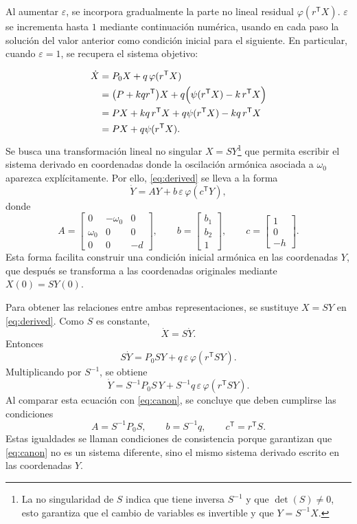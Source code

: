 \documentclass[journal]{IEEEtran}
\begin{document}
Al aumentar \(\varepsilon\), se incorpora gradualmente la
parte no lineal residual \(\varphi(r^\mathsf{T}X)\). \(\varepsilon\) se incrementa
hasta \(1\) mediante continuación numérica, usando en cada paso la solución
del valor anterior como condición inicial para el siguiente. En particular, cuando
\(\varepsilon=1\), se recupera el sistema objetivo\cite{GuanXie2025,KuznetsovEtAl2017}:

\begin{equation}
\begin{aligned}
\dot X
&=P_0X+q\,\varphi(r^\mathsf{T}X)\\
&=\bigl(P+kqr^\mathsf{T}\bigr)X
  +q\Bigl(\psi(r^\mathsf{T}X)-k\,r^\mathsf{T}X\Bigr)\\
&=PX+kq\,r^\mathsf{T}X
  +q\psi(r^\mathsf{T}X)-kq\,r^\mathsf{T}X\\
&=PX+q\psi(r^\mathsf{T}X).
\end{aligned}
\end{equation}
\noindent Se busca una transformación lineal no singular \(X=SY\)\footnote{La no singularidad de \(S\) indica que tiene inversa \(S^{-1}\) y que \(\det(S)\neq 0\), esto garantiza que el cambio de variables es invertible y que \(Y=S^{-1}X\).} que permita escribir el sistema derivado en coordenadas donde la oscilación armónica asociada a \(\omega_0\) aparezca explícitamente. Por ello, \eqref{eq:derived} se lleva a la forma
\begin{equation}\label{eq:canon}
\dot Y = AY + b\,\varepsilon\,\varphi(c^\mathsf{T}Y),
\end{equation}
donde
\[
A=
\begin{bmatrix}
0 & -\omega_0 & 0\\
\omega_0 & 0 & 0\\
0 & 0 & -d
\end{bmatrix},
\qquad
b=\begin{bmatrix}b_1\\ b_2\\ 1\end{bmatrix},
\qquad
c=\begin{bmatrix}1\\0\\-h\end{bmatrix}.
\]
Esta forma facilita construir una condición inicial armónica en las coordenadas \(Y\), que después se transforma a las coordenadas originales mediante \(X(0)=SY(0)\).

\noindent Para obtener las relaciones entre ambas representaciones, se sustituye
\(X=SY\) en \eqref{eq:derived}. Como \(S\) es constante,
\[
\dot X=S\dot Y.
\]
Entonces
\[
S\dot Y=P_0SY+q\,\varepsilon\,\varphi(r^\mathsf{T}SY).
\]
Multiplicando por \(S^{-1}\), se obtiene
\[
\dot Y
=
S^{-1}P_0S\,Y
+
S^{-1}q\,\varepsilon\,
\varphi(r^\mathsf{T}SY).
\]
Al comparar esta ecuación con \eqref{eq:canon}, se concluye que deben
cumplirse las condiciones
\begin{equation}\label{eq:relS}
A=S^{-1}P_0S,\qquad
b=S^{-1}q,\qquad
c^\mathsf{T}=r^\mathsf{T}S.
\end{equation}
Estas igualdades se llaman condiciones de consistencia porque garantizan
que \eqref{eq:canon} no es un sistema diferente, sino el mismo sistema
derivado escrito en las coordenadas \(Y\).
\end{document}
